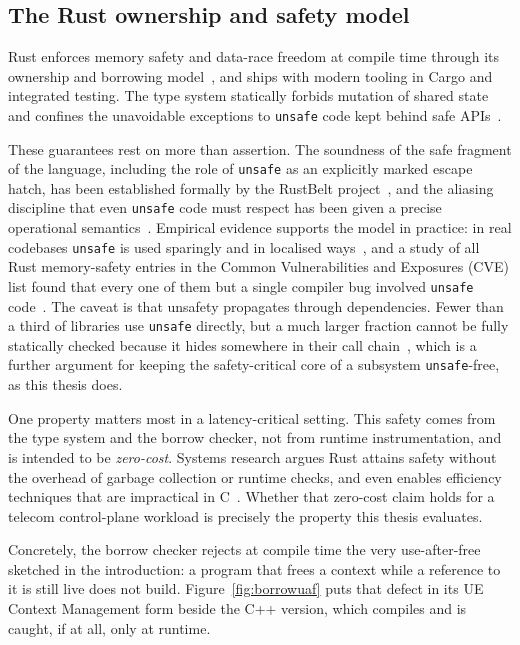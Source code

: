 \documentclass[english,oneside,a4paper,censored,csm,software-track-2020]{HYthesisML}
\begin{document}
\begin{appendices}
\section{The Rust ownership and safety model}
Rust enforces memory safety and data-race freedom at compile time through its ownership and
borrowing model~\cite{klabnik2023rust}, and ships with modern tooling in Cargo and integrated
testing. The type system statically forbids mutation of shared state and confines the
unavoidable exceptions to \texttt{unsafe} code kept behind safe APIs~\cite{jung2021safe}.

These guarantees rest on more than assertion. The soundness of the safe fragment of the
language, including the role of \texttt{unsafe} as an explicitly marked escape hatch, has
been established formally by the RustBelt project~\cite{jung2018rustbelt}, and the aliasing
discipline that even \texttt{unsafe} code must respect has been given a precise operational
semantics~\cite{jung2020stacked}. Empirical evidence supports the model in practice: in real
codebases \texttt{unsafe} is used sparingly and in localised
ways~\cite{qin2020rust,astrauskas2020unsafe}, and a study of all Rust memory-safety entries in
the Common Vulnerabilities and Exposures (CVE) list found
that every one of them but a single compiler bug involved \texttt{unsafe}
code~\cite{xu2021rustcve}. The caveat is that unsafety propagates through dependencies. Fewer
than a third of libraries use \texttt{unsafe} directly, but a much larger fraction cannot be
fully statically checked because it hides somewhere in their call
chain~\cite{evans2020rust}, which is a further argument for keeping the safety-critical core of a
subsystem \texttt{unsafe}-free, as this thesis does.

One property matters most in a latency-critical setting. This safety comes from the type system
and the borrow checker, not from runtime instrumentation, and is intended to be
\emph{zero-cost}. Systems research argues Rust attains safety without the overhead of garbage
collection or runtime checks, and even enables efficiency techniques that are impractical in
C~\cite{balasubramanian2017rust}. Whether that zero-cost claim holds for a telecom
control-plane workload is precisely the property this thesis evaluates.

Concretely, the borrow checker rejects at compile time the very use-after-free sketched in the
introduction: a program that frees a context while a reference to it is still live does not
build. Figure~\ref{fig:borrowuaf} puts that defect in its UE Context Management form beside the
C++ version, which compiles and is caught, if at all, only at runtime.


\end{appendices}
\end{document}

